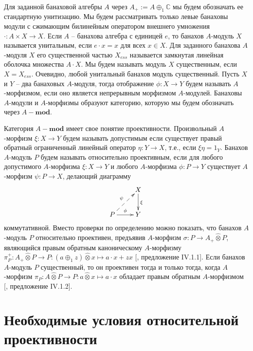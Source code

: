\documentclass[12pt]{article}
\numberwithin{equation}{subsection}
\theoremstyle{plain}
\newcommand{\projtens}{\mathbin{\widehat{\otimes}}}
\begin{document}
\begin{fulltext}
    Для заданной банаховой алгебры $A$ через $A_+:=A\oplus_1 \mathbb{C}$ мы будем обозначать ее стандартную унитизацию. Мы будем рассматривать только левые банаховы модули с сжимающим билинейным оператором внешнего умножения $\cdot:A\times X\to X$. Если $A$ -- банахова алгебра с единицей $e$, то банахов $A$-модуль $X$ называется унитальным, если $e\cdot x=x$ для всех $x\in X$. Для заданного банахова $A$-модуля $X$ его существенной частью $X_{ess}$ называется замкнутая линейная оболочка множества $A\cdot X$. Мы будем называть модуль $X$ существенным, если $X=X_{ess}$. Очевидно, любой унитальный банахов модуль существенный. Пусть $X$ и $Y$ -- два банаховых $A$-модуля, тогда отображение $\phi:X\to Y$ будем называть $A$-морфизмом, если оно является непрерывным морфизмом $A$-модулей. Банаховы $A$-модули и $A$-морфизмы образуют категорию, которую мы будем обозначать через $A-\mathbf{mod}$.

    Категория $A-\mathbf{mod}$ имеет свое понятие проективности. Произвольный $A$-мор\-физм $\xi:X\to Y$ будем называть допустимым если существует правый обратный ограниченный линейный оператор $\eta:Y\to X$, т.е., если $\xi\eta=1_Y$. Банахов $A$-модуль $P$ будем называть относительно проективным, если для любого допустимого $A$-морфизма $\xi:X\to Y$ и любого $A$-морфизма $\phi:P\to Y$ существует $A$-морфизм $\psi:P\to X$, делающий диаграмму
    $$
        \xymatrix{
        & {X} \ar[d]^{\xi}\\
        {P} \ar@{-->}[ur]^{\psi} \ar[r]^{\phi} &{Y}}
    $$
    коммутативной. Вместо проверки по определению можно показать, что банахов $A$-модуль $P$ относительно проективен, предъявив $A$-морфизм $\sigma:P\to A_+\projtens P$, являющийся правым обратным каноническому $A$-морфизму $\pi_P^+:A_+\projtens P\to P:(a\oplus_1 z)\projtens x\mapsto a\cdot x+z x$ [\cite{HelHomolBanTopAlg}, предложение IV.1.1]. Если банахов $A$-модуль $P$ существенный, то он проективен тогда и только тогда, когда $A$-морфизм $\pi_P:A\projtens P\to P: a\projtens x\mapsto a\cdot x$ обладает правым обратным $A$-морфизмом [\cite{HelHomolBanTopAlg}, предложение IV.1.2].


    \section{Необходимые условия относительной проективности}
    \label{NecessaryConditions}


\end{fulltext}
\end{document}
